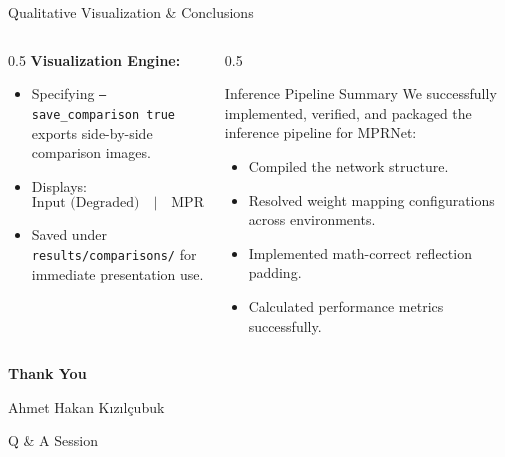 \documentclass[aspectratio=169]{beamer}
\begin{document}
\begin{frame}{Qualitative Visualization \& Conclusions}
    \begin{columns}
        \begin{column}{0.5\textwidth}
            \textbf{Visualization Engine:}
            \begin{itemize}
                \item Specifying \texttt{--save\_comparison true} exports side-by-side comparison images.
                \item Displays:
                $$\text{Input (Degraded)} \quad \Big| \quad \text{MPRNet Output} \quad \Big| \quad \text{Ground Truth}$$
                \item Saved under \texttt{results/comparisons/} for immediate presentation use.
            \end{itemize}
        \end{column}
        \begin{column}{0.5\textwidth}
            \begin{block}{Inference Pipeline Summary}
                \small
                We successfully implemented, verified, and packaged the inference pipeline for MPRNet:
                \begin{itemize}
                    \item Compiled the network structure.
                    \item Resolved weight mapping configurations across environments.
                    \item Implemented math-correct reflection padding.
                    \item Calculated performance metrics successfully.
                \end{itemize}
            \end{block}
        \end{column}
    \end{columns}
\end{frame}

\begin{frame}[plain]
    \begin{center}
        \Huge \textcolor{accentTeal}{\textbf{Thank You}}
        
        \vspace{0.6cm}
        \large Ahmet Hakan Kızılçubuk
        
        \vspace{0.2cm}
        \small Q \& A Session
    \end{center}
\end{frame}
\end{document}
